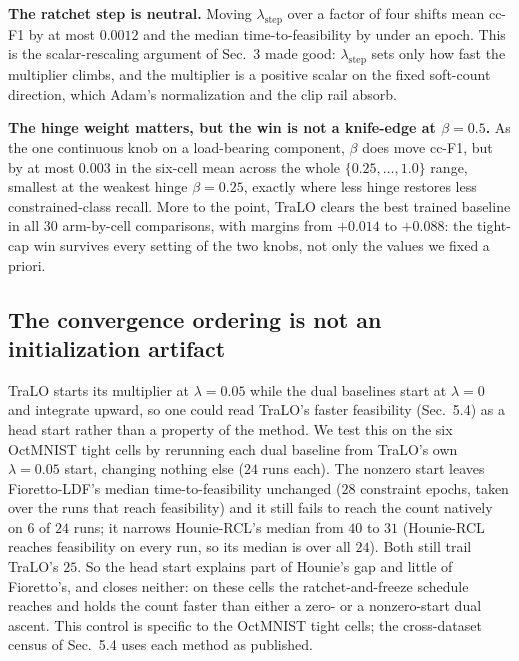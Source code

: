 \documentclass[letterpaper]{article}
\begin{document}
\textbf{The ratchet step is neutral.} Moving $\lambda_{\text{step}}$ over a factor of four
shifts mean cc-F1 by at most $0.0012$ and the median time-to-feasibility by under an epoch.
This is the scalar-rescaling argument of Sec.~3 made good: $\lambda_{\text{step}}$ sets only
how fast the multiplier climbs, and the multiplier is a positive scalar on the fixed
soft-count direction, which Adam's normalization and the clip rail absorb.

\textbf{The hinge weight matters, but the win is not a knife-edge at $\beta{=}0.5$.} As the
one continuous knob on a load-bearing component, $\beta$ does move cc-F1, but by at most
$0.003$ in the six-cell mean across the whole $\{0.25,\dots,1.0\}$ range, smallest at the
weakest hinge $\beta{=}0.25$, exactly where less hinge restores less constrained-class
recall. More to the point, TraLO clears the best trained baseline in all $30$ arm-by-cell
comparisons, with margins from $+0.014$ to $+0.088$: the tight-cap win survives every
setting of the two knobs, not only the values we fixed a priori.

\subsection{The convergence ordering is not an initialization artifact}
\label{app:init}

TraLO starts its multiplier at $\lambda{=}0.05$ while the dual baselines start at
$\lambda{=}0$ and integrate upward, so one could read TraLO's faster feasibility
(Sec.~5.4) as a head start rather than a property of the method. We test this on the six
OctMNIST tight cells by rerunning each dual baseline from TraLO's own $\lambda{=}0.05$
start, changing nothing else ($24$ runs each). The nonzero start leaves Fioretto-LDF's
median time-to-feasibility unchanged ($28$ constraint epochs, taken over the runs that
reach feasibility) and it still fails to reach the count natively on $6$ of $24$ runs; it
narrows Hounie-RCL's median from $40$ to $31$ (Hounie-RCL reaches feasibility on every run,
so its median is over all $24$).
Both still trail TraLO's $25$. So the head start explains part of Hounie's gap and little
of Fioretto's, and closes neither: on these cells the ratchet-and-freeze schedule reaches
and holds the count faster than either a zero- or a nonzero-start dual ascent. This
control is specific to the OctMNIST tight cells; the cross-dataset census of Sec.~5.4 uses
each method as published.


\end{document}

